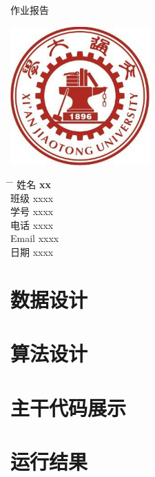 \documentclass[UTF8]{ctexart}
\begin{document}
\begin{titlepage}
    \begin{center}
        \Huge{作业报告}
        \noindent{\color{BrickRed} \rule{\linewidth}{1mm}}
        \Huge
        \vspace{0.5cm}
		\LARGE
		\vspace{1.5cm}
		\textbf{}

        \includegraphics[width=0.4\textwidth]{school_emblem.png}

        \vspace{1.5cm}
    \end{center}
    \Large
    \begin{tabbing}
        \hspace*{1em}\= \hspace*{8em} \= \kill %
        \> 姓名 \>  \textbf{xx} \\
        \> 班级 \>  xxxx \\
        \> 学号 \>  xxxx  \\
        \> 电话  \> xxxx \\
        \> Email \> xxxx \\
        \> 日期 \>  xxxx
    \end{tabbing}
    
\end{titlepage}
\setlength{\headheight}{21.89642pt}
\tableofcontents
\newpage{}
\section{数据设计}
\section{算法设计}
\section{主干代码展示}
\section{运行结果}
\end{document}
